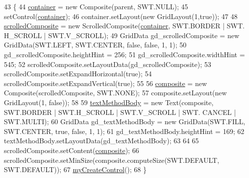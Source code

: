 \begin{DoxyCode}
43                                                 \{
44         \hyperlink{classit_1_1isislab_1_1masonassisteddocumentation_1_1mason_1_1wizards_1_1_i___start_information_page_ad86fe5776c8b93794dcdf3bfa7099c37}{container} = \textcolor{keyword}{new} Composite(parent, SWT.NULL);
45         setControl(\hyperlink{classit_1_1isislab_1_1masonassisteddocumentation_1_1mason_1_1wizards_1_1_i___start_information_page_ad86fe5776c8b93794dcdf3bfa7099c37}{container});
46         container.setLayout(\textcolor{keyword}{new} GridLayout(1,\textcolor{keyword}{true}));
47         
48         \hyperlink{classit_1_1isislab_1_1masonassisteddocumentation_1_1mason_1_1wizards_1_1_i___start_information_page_a8ceeef097246f40de9ca88f3276661d8}{scrolledComposite} = \textcolor{keyword}{new} ScrolledComposite(\hyperlink{classit_1_1isislab_1_1masonassisteddocumentation_1_1mason_1_1wizards_1_1_i___start_information_page_ad86fe5776c8b93794dcdf3bfa7099c37}{container}, SWT.BORDER | SWT.
      H\_SCROLL | SWT.V\_SCROLL);
49         GridData gd\_scrolledComposite = \textcolor{keyword}{new} GridData(SWT.LEFT, SWT.CENTER, \textcolor{keyword}{false}, \textcolor{keyword}{false}, 1, 1);
50         gd\_scrolledComposite.heightHint = 256;
51         gd\_scrolledComposite.widthHint = 545;
52         scrolledComposite.setLayoutData(gd\_scrolledComposite);
53         scrolledComposite.setExpandHorizontal(\textcolor{keyword}{true});
54         scrolledComposite.setExpandVertical(\textcolor{keyword}{true});
55         
56         \hyperlink{classit_1_1isislab_1_1masonassisteddocumentation_1_1mason_1_1wizards_1_1_i___start_information_page_a0b4e57697b3d0beb37e32157277604c9}{composite} = \textcolor{keyword}{new} Composite(scrolledComposite, SWT.NONE);
57         composite.setLayout(\textcolor{keyword}{new} GridLayout(1, \textcolor{keyword}{false}));
58         
59         \hyperlink{classit_1_1isislab_1_1masonassisteddocumentation_1_1mason_1_1wizards_1_1_i___start_information_page_a858c21e714eee1277872dc8e8d190094}{textMethodBody} = \textcolor{keyword}{new} Text(composite, SWT.BORDER | SWT.H\_SCROLL | SWT.V\_SCROLL | SWT.
      CANCEL | SWT.MULTI);
60         GridData gd\_textMethodBody = \textcolor{keyword}{new} GridData(SWT.FILL, SWT.CENTER, \textcolor{keyword}{true}, \textcolor{keyword}{false}, 1, 1);
61         gd\_textMethodBody.heightHint = 169;
62         textMethodBody.setLayoutData(gd\_textMethodBody);
63         
64     
65         scrolledComposite.setContent(\hyperlink{classit_1_1isislab_1_1masonassisteddocumentation_1_1mason_1_1wizards_1_1_i___start_information_page_a0b4e57697b3d0beb37e32157277604c9}{composite});
66         scrolledComposite.setMinSize(composite.computeSize(SWT.DEFAULT, SWT.DEFAULT));
67         \hyperlink{classit_1_1isislab_1_1masonassisteddocumentation_1_1mason_1_1wizards_1_1_i___start_information_page_ae0a18d33050e71d0c590f8da3f4a3390}{myCreateControl}();
68     \}
\end{DoxyCode}



